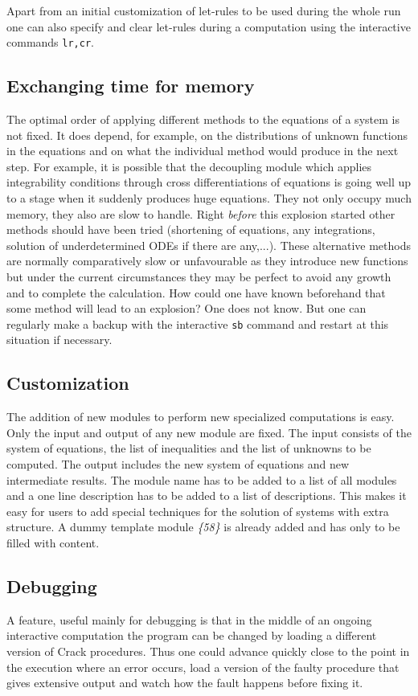 \documentclass[12pt]{article}
\begin{document}
  Apart from an initial customization of let-rules to be used during the
  whole run one can also specify and clear let-rules during a
  computation using the interactive commands {\tt lr,cr}.

\subsection{Exchanging time for memory}
  The optimal order of applying different methods to the equations of a system
  is not fixed. It does depend, for example, on the distributions of
  unknown functions in the 
  equations and on what the individual method would produce in the next
  step. For example, it is possible that the
  decoupling module which applies integrability conditions through cross
  differentiations of equations is going well up to a stage when it
  suddenly produces huge equations. They not only occupy much memory,
  they also are slow to handle.
  Right {\em before} this explosion started other methods should
  have been tried (shortening of equations, any integrations, solution of
  underdetermined ODEs if there are any,...). These alternative methods are normally
  comparatively slow or unfavourable as they introduce new functions but
  under the current circumstances they may be perfect to avoid any growth
  and to complete the calculation. How could one have known beforehand that some
  method will lead to an explosion? One does not know. But one can
  regularly make a backup with the interactive {\tt sb} command and
  restart at this situation if necessary.

\subsection{Customization}
  The addition of new modules to perform new specialized computations
  is easy.  Only the input and output of any new module are fixed.
  The input consists of the system of equations, the list of
  inequalities and the list of unknowns to be computed. The output
  includes the new system of equations and new intermediate
  results. The module name has to be added to a list of all modules
  and a one line description has to be added to a list of
  descriptions.  This makes it easy for users to add special
  techniques for the solution of systems with extra structure. A dummy
  template module {\em \{58\} } is already added and has only to be
  filled with content.

\subsection{Debugging}
  A feature, useful mainly for debugging is that in the middle of an
  ongoing interactive computation the program can be changed by
  loading a different version of {\sc Crack} procedures. Thus one
  could advance quickly close to the point in the execution where an
  error occurs, load a version of the faulty procedure that gives
  extensive output and watch how the fault happens before fixing it.
  
\end{document}
